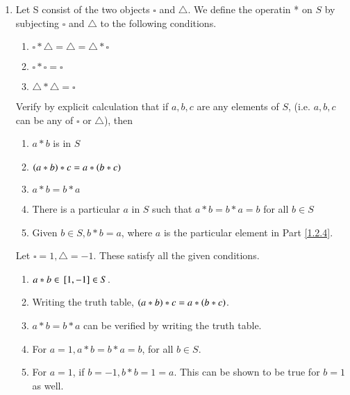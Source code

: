 \begin{enumerate}[label=\arabic*.,ref=\thesubsection.\theenumi]
\begin{enumerate}
		\end{enumerate}
	\item Let S consist of the two objects $\square$ and $\triangle$.  We define the operatin * on $S$ by 
		subjecting $\square$ and $\triangle$ to the following conditions.
		\begin{enumerate}
			\item $\square * \triangle = \triangle = \triangle *\square $
			\item $\square * \square = \square $
			\item $\triangle *\triangle =\square $
		\end{enumerate}
		Verify by explicit calculation that if $a,b,c$ are any elements of $S$, (i.e. $a,b,c$ can be any of $\square$ or $\triangle$), then 
		\begin{enumerate}
			\item $a*b$ is in $S$
			\item $\left(a*b\right)*c = a*\left(b*c\right)$ 
			\item $a*b = b*a$
			\item There is a particular $a$ in $S$ such that $a*b = b*a = b$ for all $b \in S$
				\label{1.2.4}
			\item Given $b \in S, b*b = a$, where $a$ is the particular element in Part 
				\ref{1.2.4}.
		\end{enumerate}
		\solution Let $\square = 1, \triangle = -1$.  These satisfy all the given conditions.
		\begin{enumerate}
			\item $a*b \in {}\left[1, -1\right] \in S$.
			\item Writing the truth table, $\left(a*b\right)*c = a*\left(b*c\right)$.
			\item $a*b = b*a$ can be verified by writing the truth table.
			\item For $a = 1, a*b = b*a = b$, for all $b \in S$.
			\item For $a = 1$, if $b= -1, b*b = 1 = a$.  This can be shown to be true for $b =1$ as well.
		\end{enumerate}

\end{enumerate}
